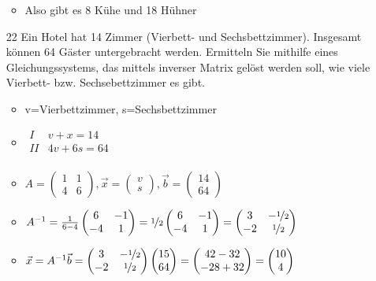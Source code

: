 \documentclass{article}
\begin{document}
\begin{itemize}
\begin{itemize}
			\item{Also gibt es 8 Kühe und 18 Hühner}
		\end{itemize}
		\item[22]{Ein Hotel hat 14 Zimmer (Vierbett- und Sechsbettzimmer). Insgesamt können 64 Gäster untergebracht werden. Ermitteln Sie mithilfe eines Gleichungssystems, das mittels inverser Matrix gelöst werden soll, wie viele Vierbett- bzw. Sechsebettzimmer es gibt.}
		\begin{itemize}
			\item{v=Vierbettzimmer, s=Sechsbettzimmer}
			\item{$\begin{matrix} I & v+x=14 \\ II & 4v+6s=64 \\  \end{matrix}$}
			\item{$A=\begin{pmatrix} 1 & 1 \\ 4 & 6 \end{pmatrix}, \vec{x}=\begin{pmatrix} v \\ s \end{pmatrix}, \vec{b}=\begin{pmatrix} 14 \\ 64 \end{pmatrix}$}
			\item{$A^{-1}=\frac{1}{6-4}\begin{pmatrix} 6 & -1 \\ -4 & 1 \end{pmatrix}= \nicefrac{1}{2}\begin{pmatrix} 6 & -1 \\ -4 & 1 \end{pmatrix}=\begin{pmatrix} 3 & -\nicefrac{1}{2} \\ -2 & \nicefrac{1}{2} \end{pmatrix}$}
			\item{$\vec{x}=A^{-1}\vec{b}=\begin{pmatrix} 3 & -\nicefrac{1}{2} \\ -2 & \nicefrac{1}{2} \end{pmatrix}\begin{pmatrix} 15 \\ 64 \end{pmatrix}=\begin{pmatrix} 42-32 \\ -28+32 \end{pmatrix}=\begin{pmatrix} 10 \\ 4 \end{pmatrix}$}

\end{itemize}
\end{itemize}
\end{document}
